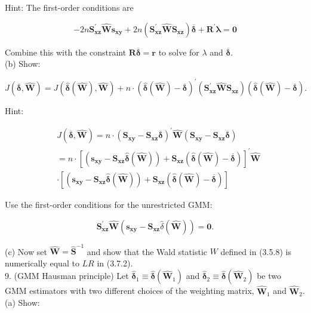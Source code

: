 \documentclass[10pt]{article}
\begin{document}
Hint: The first-order conditions are

$$
-2 n \mathbf{S}_{\mathbf{x z}}^{\prime} \widehat{\mathbf{W}} \mathbf{s}_{\mathbf{x y}}+2 n\left(\mathbf{S}_{\mathbf{x z}}^{\prime} \widehat{\mathbf{W}} \mathbf{S}_{\mathbf{x z}}\right) \overline{\boldsymbol{\delta}}+\mathbf{R}^{\prime} \boldsymbol{\lambda}=\mathbf{0}
$$

Combine this with the constraint $\mathbf{R} \overline{\boldsymbol{\delta}}=\mathbf{r}$ to solve for $\lambda$ and $\overline{\boldsymbol{\delta}}$.\\
(b) Show:

$$
J(\overline{\boldsymbol{\delta}}, \widehat{\mathbf{W}})=J(\hat{\boldsymbol{\delta}}(\widehat{\mathbf{W}}), \widehat{\mathbf{W}})+n \cdot(\hat{\boldsymbol{\delta}}(\widehat{\mathbf{W}})-\overline{\boldsymbol{\delta}})^{\prime}\left(\mathbf{S}_{\mathbf{x z}}^{\prime} \widehat{\mathbf{W}} \mathbf{S}_{\mathbf{x z}}\right)(\hat{\boldsymbol{\delta}}(\widehat{\mathbf{W}})-\overline{\boldsymbol{\delta}}) .
$$

Hint:

$$
\begin{aligned}
& J(\overline{\boldsymbol{\delta}}, \widehat{\mathbf{W}})=n \cdot\left(\mathbf{S}_{\mathbf{x y}}-\mathbf{S}_{\mathbf{x z}} \overline{\boldsymbol{\delta}}\right)^{\prime} \widehat{\mathbf{W}}\left(\mathbf{S}_{\mathbf{x y}}-\mathbf{S}_{\mathbf{x z}} \overline{\boldsymbol{\delta}}\right) \\
&=n \cdot\left[\left(\mathbf{s}_{\mathbf{x y}}-\mathbf{S}_{\mathbf{x z}} \hat{\boldsymbol{\delta}}(\widehat{\mathbf{W}})\right)+\mathbf{S}_{\mathbf{x z}}(\hat{\boldsymbol{\delta}}(\widehat{\mathbf{W}})-\overline{\boldsymbol{\delta}})\right]^{\prime} \widehat{\mathbf{W}} \\
& \cdot\left[\left(\mathbf{s}_{\mathbf{x y}}-\mathbf{S}_{\mathbf{x z}} \hat{\boldsymbol{\delta}}(\widehat{\mathbf{W}})\right)+\mathbf{S}_{\mathbf{x z}}(\hat{\boldsymbol{\delta}}(\widehat{\mathbf{W}})-\overline{\boldsymbol{\delta}})\right]
\end{aligned}
$$

Use the first-order conditions for the unrestricted GMM:

$$
\mathbf{S}_{\mathbf{x z}}^{\prime} \widehat{\mathbf{W}}\left(\mathbf{s}_{\mathbf{x y}}-\mathbf{S}_{\mathbf{x z}} \hat{\delta}(\widehat{\mathbf{W}})\right)=\mathbf{0} .
$$

(c) Now set $\widehat{\mathbf{W}}=\widehat{\mathbf{S}}^{-1}$ and show that the Wald statistic $W$ defined in (3.5.8) is numerically equal to $L R$ in (3.7.2).\\
9. (GMM Hausman principle) Let $\hat{\boldsymbol{\delta}}_{1} \equiv \hat{\boldsymbol{\delta}}\left(\widehat{\mathbf{W}}_{1}\right)$ and $\hat{\boldsymbol{\delta}}_{2} \equiv \hat{\boldsymbol{\delta}}\left(\widehat{\mathbf{W}}_{2}\right)$ be two GMM estimators with two different choices of the weighting matrix, $\widehat{\mathbf{W}}_{1}$ and $\widehat{\mathbf{W}}_{2}$.\\
(a) Show:
\end{document}
